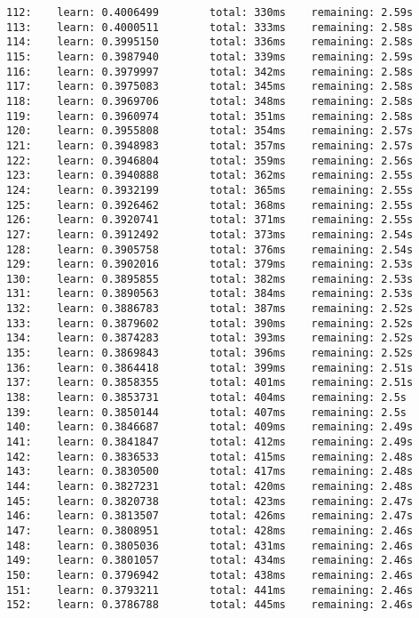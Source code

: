 \documentclass[11pt]{article}
\begin{document}
\begin{Verbatim}[commandchars=\\\{\}]
112:    learn: 0.4006499        total: 330ms    remaining: 2.59s
113:    learn: 0.4000511        total: 333ms    remaining: 2.58s
114:    learn: 0.3995150        total: 336ms    remaining: 2.58s
115:    learn: 0.3987940        total: 339ms    remaining: 2.59s
116:    learn: 0.3979997        total: 342ms    remaining: 2.58s
117:    learn: 0.3975083        total: 345ms    remaining: 2.58s
118:    learn: 0.3969706        total: 348ms    remaining: 2.58s
119:    learn: 0.3960974        total: 351ms    remaining: 2.58s
120:    learn: 0.3955808        total: 354ms    remaining: 2.57s
121:    learn: 0.3948983        total: 357ms    remaining: 2.57s
122:    learn: 0.3946804        total: 359ms    remaining: 2.56s
123:    learn: 0.3940888        total: 362ms    remaining: 2.55s
124:    learn: 0.3932199        total: 365ms    remaining: 2.55s
125:    learn: 0.3926462        total: 368ms    remaining: 2.55s
126:    learn: 0.3920741        total: 371ms    remaining: 2.55s
127:    learn: 0.3912492        total: 373ms    remaining: 2.54s
128:    learn: 0.3905758        total: 376ms    remaining: 2.54s
129:    learn: 0.3902016        total: 379ms    remaining: 2.53s
130:    learn: 0.3895855        total: 382ms    remaining: 2.53s
131:    learn: 0.3890563        total: 384ms    remaining: 2.53s
132:    learn: 0.3886783        total: 387ms    remaining: 2.52s
133:    learn: 0.3879602        total: 390ms    remaining: 2.52s
134:    learn: 0.3874283        total: 393ms    remaining: 2.52s
135:    learn: 0.3869843        total: 396ms    remaining: 2.52s
136:    learn: 0.3864418        total: 399ms    remaining: 2.51s
137:    learn: 0.3858355        total: 401ms    remaining: 2.51s
138:    learn: 0.3853731        total: 404ms    remaining: 2.5s
139:    learn: 0.3850144        total: 407ms    remaining: 2.5s
140:    learn: 0.3846687        total: 409ms    remaining: 2.49s
141:    learn: 0.3841847        total: 412ms    remaining: 2.49s
142:    learn: 0.3836533        total: 415ms    remaining: 2.48s
143:    learn: 0.3830500        total: 417ms    remaining: 2.48s
144:    learn: 0.3827231        total: 420ms    remaining: 2.48s
145:    learn: 0.3820738        total: 423ms    remaining: 2.47s
146:    learn: 0.3813507        total: 426ms    remaining: 2.47s
147:    learn: 0.3808951        total: 428ms    remaining: 2.46s
148:    learn: 0.3805036        total: 431ms    remaining: 2.46s
149:    learn: 0.3801057        total: 434ms    remaining: 2.46s
150:    learn: 0.3796942        total: 438ms    remaining: 2.46s
151:    learn: 0.3793211        total: 441ms    remaining: 2.46s
152:    learn: 0.3786788        total: 445ms    remaining: 2.46s

\end{Verbatim}
\end{document}
